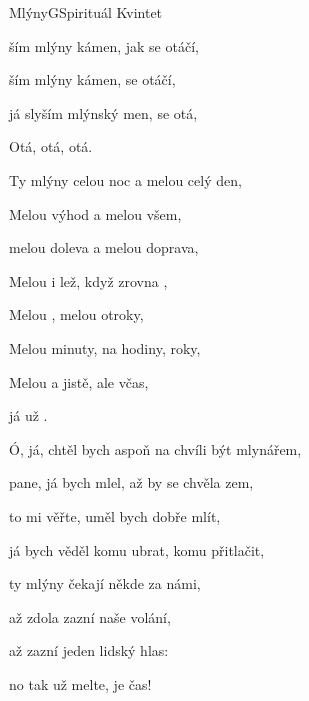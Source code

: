 \begin{song}{Mlýny}{G}{Spirituál Kvintet}

\begin{SBChorus}

ším mlýny kámen, jak se otáčí,

ším mlýny kámen,  se otáčí,

já slyším mlýnský men,  se otá,

Otá, otá, otá.

\end{SBChorus}

\begin{SBVerse}

Ty mlýny  celou noc a melou celý den,

Melou  výhod a melou  všem,

melou doleva a melou doprava,

Melou  i lež, když zrovna ,

Melou , melou otroky,

Melou  minuty, na hodiny,  roky,

Melou  a jistě, ale  včas,

já už   .

\end{SBVerse}

\begin{SBChorus}

\end{SBChorus}

\begin{SBVerse}

Ó, já, chtěl bych aspoň na chvíli být mlynářem,

pane, já bych mlel, až by se chvěla zem,

to mi věřte, uměl bych dobře mlít,

já bych věděl komu ubrat, komu přitlačit,

ty mlýny čekají někde za námi,

až zdola zazní naše volání,

až zazní jeden lidský hlas:

no tak už melte, je čas!

\end{SBVerse}

\begin{SBChorus}

\end{SBChorus}

\end{song}

\clearpage
